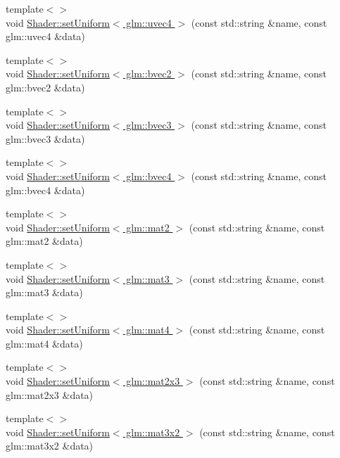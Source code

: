 \begin{DoxyCompactItemize}
{\footnotesize template$<$$>$ }\\void \hyperlink{namespace_graphics_a3529c65e26aad587f61d342ae1272bab}{Shader\+::set\+Uniform$<$ glm\+::uvec4 $>$} (const std\+::string \&name, const glm\+::uvec4 \&data)
\item 
{\footnotesize template$<$$>$ }\\void \hyperlink{namespace_graphics_a99a2818818bf096f15647e6cb9fbebb7}{Shader\+::set\+Uniform$<$ glm\+::bvec2 $>$} (const std\+::string \&name, const glm\+::bvec2 \&data)
\item 
{\footnotesize template$<$$>$ }\\void \hyperlink{namespace_graphics_a467fa2192f8d4e2c4903c67d8b5e5d30}{Shader\+::set\+Uniform$<$ glm\+::bvec3 $>$} (const std\+::string \&name, const glm\+::bvec3 \&data)
\item 
{\footnotesize template$<$$>$ }\\void \hyperlink{namespace_graphics_ae6eb1dca41798b9c77f3fd47b53a84cb}{Shader\+::set\+Uniform$<$ glm\+::bvec4 $>$} (const std\+::string \&name, const glm\+::bvec4 \&data)
\item 
{\footnotesize template$<$$>$ }\\void \hyperlink{namespace_graphics_acb3a4f16a80727909d8a6a0c926be28c}{Shader\+::set\+Uniform$<$ glm\+::mat2 $>$} (const std\+::string \&name, const glm\+::mat2 \&data)
\item 
{\footnotesize template$<$$>$ }\\void \hyperlink{namespace_graphics_a3574d53c9806d0d059c7b6165318357a}{Shader\+::set\+Uniform$<$ glm\+::mat3 $>$} (const std\+::string \&name, const glm\+::mat3 \&data)
\item 
{\footnotesize template$<$$>$ }\\void \hyperlink{namespace_graphics_a64cdb46ea0bfcd3896a199ca6a27d443}{Shader\+::set\+Uniform$<$ glm\+::mat4 $>$} (const std\+::string \&name, const glm\+::mat4 \&data)
\item 
{\footnotesize template$<$$>$ }\\void \hyperlink{namespace_graphics_a848bdc81e9aa80ffaaf4b053045a3f0d}{Shader\+::set\+Uniform$<$ glm\+::mat2x3 $>$} (const std\+::string \&name, const glm\+::mat2x3 \&data)
\item 
{\footnotesize template$<$$>$ }\\void \hyperlink{namespace_graphics_a073d2a598a97005055e83c1c80ebeaf5}{Shader\+::set\+Uniform$<$ glm\+::mat3x2 $>$} (const std\+::string \&name, const glm\+::mat3x2 \&data)
\item 

\end{DoxyCompactItemize}
